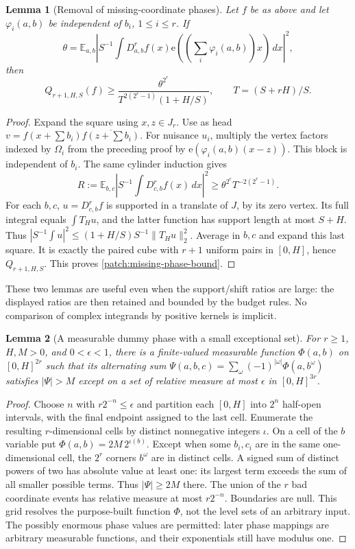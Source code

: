 \documentclass[11pt]{article}
\newtheorem{lemma}[lemma]{Lemma}
\theoremstyle{definition}
\newcommand{\ee}[1]{\mathrm e\!\left(#1\right)}
\begin{document}
\begin{lemma}[Removal of missing-coordinate phases]\label{patch:missing-phase}
Let $f$ be as above and let $\varphi_i(a,b)$ be independent of $b_i$, $1\leq i\leq r$.
If
\[
 \theta=\mathbb E_{a,b}
       \left|S^{-1}\int D_{a,b}^{r}f(x)\ee{(\sum_i\varphi_i(a,b))x}\,dx\right|^2,
\]
then
\begin{equation}\label{patch:missing-phase-bound}
 Q_{r+1,H,S}(f)\geq
       \frac{\theta^{2^r}}{T^{2(2^r-1)}(1+H/S)},\qquad T=(S+rH)/S.
\end{equation}
\end{lemma}
\begin{proof}
Expand the square using $x,z\in J_r$.
Use as head $v=f(x+\sum b_i)\overline{f(z+\sum b_i)}$.
For nuisance $u_i$, multiply the vertex factors indexed by $\Omega_i$ from the preceding
proof by $\ee{\varphi_i(a,b)(x-z)}$.  This block is independent of $b_i$.
The same cylinder induction gives
\[
 R:=\mathbb E_{b,c}\left|S^{-1}\int D_{c,b}^{r}f(x)\,dx\right|^2
       \geq\theta^{2^r}T^{-2(2^r-1)}.
\]
For each $b,c$, $u=D_{c,b}^{r}f$ is supported in a translate of $J$, by its zero vertex.
Its full integral equals $\int T_Hu$, and the latter function has support length at most $S+H$.
Thus $|S^{-1}\int u|^2\leq(1+H/S)S^{-1}\|T_Hu\|_2^2$.
Average in $b,c$ and expand this last square.  It is exactly the paired cube with $r+1$
uniform pairs in $[0,H]$, hence $Q_{r+1,H,S}$.  This proves \eqref{patch:missing-phase-bound}.
\end{proof}
These two lemmas are useful even when the support/shift ratios are large: the displayed
ratios are then retained and bounded by the budget rules.  No comparison of complex
integrands by positive kernels is implicit.

\begin{lemma}[A measurable dummy phase with a small exceptional set]\label{patch:dummy-phase}
For $r\geq1$, $H,M>0$, and $0<\epsilon<1$, there is a finite-valued measurable function
$\Phi(a,b)$ on $[0,H]^{2r}$ such that its alternating sum
$\Psi(a,b,c)=\sum_\omega(-1)^{|\omega|}\Phi(a,b^\omega)$ satisfies $|\Psi|>M$ except on
a set of relative measure at most $\epsilon$ in $[0,H]^{3r}$.
\end{lemma}
\begin{proof}
Choose $n$ with $r2^{-n}\leq\epsilon$ and partition each $[0,H]$ into $2^n$ half-open
intervals, with the final endpoint assigned to the last cell.
Enumerate the resulting $r$-dimensional cells by distinct nonnegative integers $\iota$.
On a cell of the $b$ variable put $\Phi(a,b)=2M\,2^{\iota(b)}$.
Except when some $b_i,c_i$ are in the same one-dimensional cell, the $2^r$ corners $b^\omega$
are in distinct cells.  A signed sum of distinct powers of two has absolute value at least
one: its largest term exceeds the sum of all smaller possible terms.
Thus $|\Psi|\geq2M$ there.  The union of the $r$ bad coordinate events has relative measure
at most $r2^{-n}$.  Boundaries are null.  This grid resolves the purpose-built function
$\Phi$, not the level sets of an arbitrary input.  The possibly enormous phase values are
permitted: later phase mappings are arbitrary measurable functions, and their exponentials
still have modulus one.
\end{proof}
\end{document}
